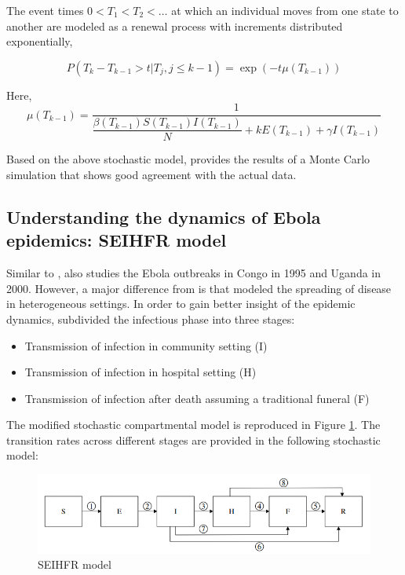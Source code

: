 \documentclass[10pt, journal,onecolumn]{IEEEtran}
\begin{document}
The event times $0<T_1<T_2<\ldots$ at which an individual moves from one state to another are modeled as a renewal process with increments distributed exponentially,

\begin{equation}
P(T_k-T_{k-1} > t | T_j, j\leq k-1) = \exp(-t \mu (T_{k-1}) )
\end{equation}

Here,
\[
\mu (T_{k-1}) = \frac{1}{\dfrac{\beta(T_{k-1}) S(T_{k-1}) I(T_{k-1})}{N} + k E(T_{k-1}) + \gamma I(T_{k-1})}
\]

Based on the above stochastic model, \citep{chowell2004basic} provides the results of a Monte Carlo
simulation that shows good agreement with the actual data.

\subsection{\textbf{Understanding the dynamics of Ebola epidemics: SEIHFR model \citep{legrand2007understanding}}}

Similar to \citep{chowell2004basic}, \citep{legrand2007understanding} also studies the Ebola
outbreaks in Congo in 1995 and Uganda in 2000. However, a major difference from
\citep{chowell2004basic} is that \citep{legrand2007understanding} modeled the spreading of disease
in heterogeneous settings. In order to gain better insight of the epidemic dynamics,
\citep{legrand2007understanding} subdivided the infectious phase into three stages:

\begin{itemize}
\item Transmission of infection in community setting (I)
\item Transmission of infection in hospital setting (H)
\item Transmission of infection after death assuming a traditional funeral (F)
\end{itemize}


The modified stochastic compartmental model is reproduced in Figure \ref{fig:SEIHFR_model}. The
transition rates across different stages are provided in the following stochastic model:

\begin{figure}[h!]
\centering
\includegraphics[scale=0.5]{seihfr_model_fig}
\caption{SEIHFR model}
\label{fig:SEIHFR_model}
\end{figure}
\end{document}
